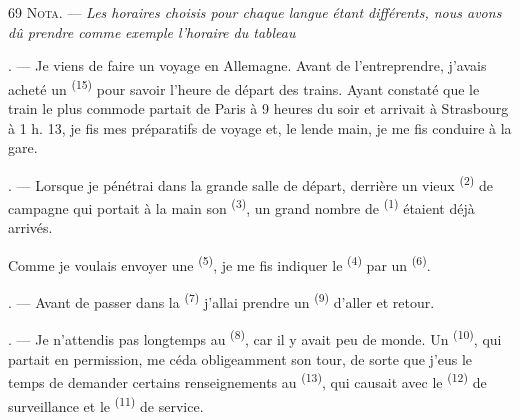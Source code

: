 \begin{VUpage}[71]{69}
\VUsaut{4.0mm}
\VUsaut{2.4mm}
\VUsaut{0.8mm}
\VUsaut{3.4mm}
\VUblancAlinea
\textsc{Nota.} --- \textit{Les horaires choisis pour chaque langue}\nl
\textit{étant différents, nous avons dû prendre comme}\nl
\textit{exemple l'horaire du tableau} 

. --- Je viens de faire un voyage en Allemagne.\nl
Avant de l'entreprendre, j'avais acheté un \cc
{} \textsuperscript{(15)} pour savoir l'heure de départ des trains.\nl
Ayant constaté que le train le plus commode partait\nl
de Paris à 9 heures du soir et arrivait à Strasbourg\nl
à 1 h. 13, je fis mes préparatifs de voyage et, le lende\cc
main, je me fis conduire à la gare.

. --- Lorsque je pénétrai dans la grande salle de\nl
départ, derrière un vieux  \textsuperscript{(2)} de campagne\nl
qui portait à la main son  \textsuperscript{(3)}, un grand\nl
nombre de  \textsuperscript{(1)} étaient déjà arrivés.

\VUblancAlinea
Comme je voulais envoyer une \cc
{} \textsuperscript{(5)}, je me fis indiquer le \cc
{} \textsuperscript{(4)} par un  \textsuperscript{(6)}.

. --- Avant de passer dans la  \textsuperscript{(7)}\nl
j'allai prendre un \textsuperscript{(9)} d'aller et retour.

. --- Je n'attendis pas longtemps au  \textsuperscript{(8)},\nl
car il y avait peu de monde. Un  \textsuperscript{(10)}, qui\nl
partait en permission, me céda obligeamment son\nl
tour, de sorte que j'eus le temps de demander certains\nl
renseignements au  \textsuperscript{(13)}, qui causait avec\nl
le  \textsuperscript{(12)} de surveillance et le \cc
{} \textsuperscript{(11)} de service.


\end{VUpage}
